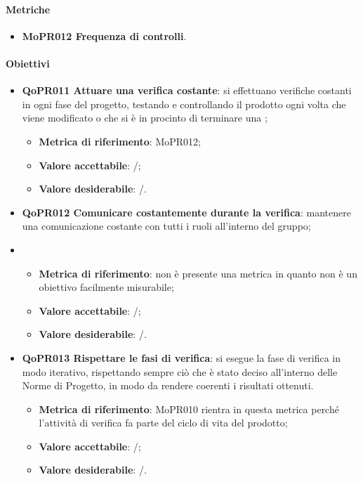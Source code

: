 \documentclass[../piano-di-qualifica.tex]{subfiles}
\begin{document}
\paragraph{Metriche}
\label{sub:metriche_4}
\begin{itemize}
    \item \textbf{MoPR012 Frequenza di controlli}.
\end{itemize}

\paragraph{Obiettivi}
\label{sub:obiettivi_4}
\begin{itemize}
    \item \textbf{QoPR011 Attuare una verifica costante}: si effettuano verifiche costanti in ogni fase del progetto, testando e controllando il prodotto ogni volta che viene modificato o che si è in procinto di terminare una ;
    \begin{itemize}
        \item \textbf{Metrica di riferimento}: MoPR012;
        \item \textbf{Valore accettabile}: /; %
        \item \textbf{Valore desiderabile}: /.
    \end{itemize}
    \item \textbf{QoPR012 Comunicare costantemente durante la verifica}: mantenere una comunicazione costante con tutti i ruoli all'interno del gruppo;
    \item \begin{itemize}
        \item \textbf{Metrica di riferimento}: non è presente una metrica in quanto non è un obiettivo facilmente misurabile;
        \item \textbf{Valore accettabile}: /; %
        \item \textbf{Valore desiderabile}: /.
    \end{itemize}
    \item \textbf{QoPR013 Rispettare le fasi di verifica}: si esegue la fase di verifica in modo iterativo, rispettando sempre ciò che è stato deciso all'interno delle Norme di Progetto, in modo da rendere coerenti i risultati ottenuti.
        \begin{itemize}
            \item \textbf{Metrica di riferimento}: MoPR010 rientra in questa metrica perché l'attività di verifica fa parte del ciclo di vita del prodotto;
            \item \textbf{Valore accettabile}: /; %
            \item \textbf{Valore desiderabile}: /.
        \end{itemize}
\end{itemize}
\end{document}
